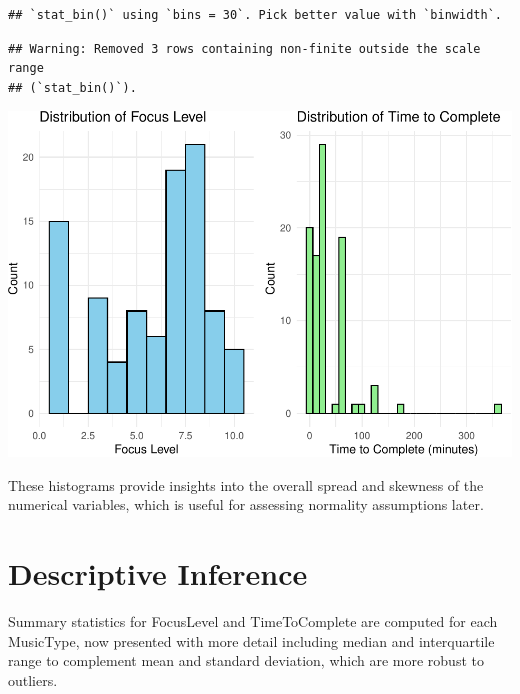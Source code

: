 \documentclass[
]{article}
\begin{document}
\begin{verbatim}
## `stat_bin()` using `bins = 30`. Pick better value with `binwidth`.
\end{verbatim}

\begin{verbatim}
## Warning: Removed 3 rows containing non-finite outside the scale range
## (`stat_bin()`).
\end{verbatim}

\includegraphics{Assignment2_files/figure-latex/unnamed-chunk-4-1.pdf}

These histograms provide insights into the overall spread and skewness
of the numerical variables, which is useful for assessing normality
assumptions later.

\section{Descriptive Inference}\label{descriptive-inference}

Summary statistics for FocusLevel and TimeToComplete are computed for
each MusicType, now presented with more detail including median and
interquartile range to complement mean and standard deviation, which are
more robust to outliers.
\end{document}
